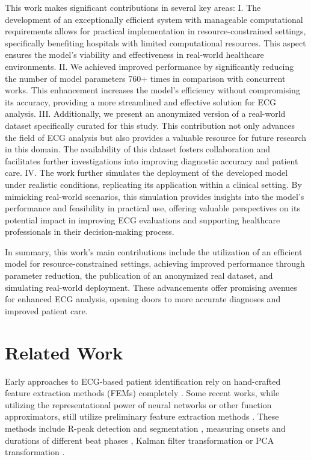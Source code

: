 \documentclass[preprint,12pt]{elsarticle}
\begin{document}
This work makes significant contributions in several key areas:
I. The development of an exceptionally efficient system with manageable computational requirements allows for practical implementation in resource-constrained settings, specifically benefiting hospitals with limited computational resources. This aspect ensures the model's viability and effectiveness in real-world healthcare environments.
II. We achieved improved performance by significantly reducing the number of model parameters 760+ times in comparison with concurrent works. This enhancement increases the model's efficiency without compromising its accuracy, providing a more streamlined and effective solution for ECG analysis.
III. Additionally, we present an anonymized version of a real-world dataset specifically curated for this study. This contribution not only advances the field of ECG analysis but also provides a valuable resource for future research in this domain. The availability of this dataset fosters collaboration and facilitates further investigations into improving diagnostic accuracy and patient care.
IV. The work further simulates the deployment of the developed model under realistic conditions, replicating its application within a clinical setting. By mimicking real-world scenarios, this simulation provides insights into the model's performance and feasibility in practical use, offering valuable perspectives on its potential impact in improving ECG evaluations and supporting healthcare professionals in their decision-making process.

In summary, this work's main contributions include the utilization of an efficient model for resource-constrained settings, achieving improved performance through parameter reduction, the publication of an anonymized real dataset, and simulating real-world deployment. These advancements offer promising avenues for enhanced ECG analysis, opening doors to more accurate diagnoses and improved patient care.



\section{Related Work}
\label{sec:rel_work}

Early approaches to ECG-based patient identification rely on hand-crafted feature extraction methods (FEMs) completely \cite{biel2001ecg, saechia2005human}. Some recent works, while utilizing the representational power of neural networks or other function approximators, still utilize preliminary feature extraction methods \cite{karpagachelvi2010ecg, el_rahman2019biometric, patro2017effective, ko2019ecg, boumbarov2009ecg}. These methods include R-peak detection \cite{qin2017adaptive, kaur2019novel, rajani2021r, gupta2020r, laitala2020robust} and segmentation \cite{kim2020ecg}, measuring onsets and durations of different beat phases \cite{biel2001ecg, ko2019ecg, pathoumvanh2013ecg}, Kalman filter transformation \cite{ting2010ecg} or PCA transformation \cite{boumbarov2009ecg}.
\end{document}
